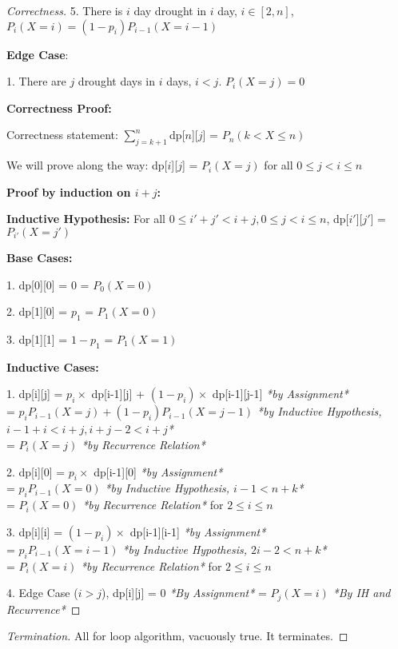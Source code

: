 \documentclass[openany]{article}
\begin{document}
\begin{proof}[Correctness]{}
5. There is $i$ day drought in $i$ day, $i\in[2,n]$,
$P_i(X=i)=(1-p_i)P_{i-1}(X=i-1)$
    
\textbf{Edge Case}:

1. There are $j$ drought days in $i$ days, $i<j$. $P_i(X=j) = 0$

\textbf{Correctness Proof:}

Correctness statement: $\sum_{j=k+1}^{n}$dp[$n$][$j$] = $P_n(k<X\leq n)$
  
We will prove along the way: dp[$i$][$j$] = $P_i(X=j)$ for all $ 0 \leq j < i \leq n$

\textbf{Proof by induction on $i+j$:}

\textbf{Inductive Hypothesis:} For all $0 \leq i'+j'<i+j,0 \leq j < i \leq n$, dp[$i'$][$j'$] = $P_{i'}(X=j')$

\textbf{Base Cases:}

1. dp[0][0] = 0 = $P_0(X=0)$

2. dp[1][0] = $p_1$ = $P_1(X=0)$

3. dp[1][1] = $1-p_1$ = $P_1(X=1)$

\textbf{Inductive Cases:}

1. dp[i][j] = $p_i \times$ dp[i-1][j] + $(1-p_i) \times$ dp[i-1][j-1] \textit{*by Assignment*} \\= $p_i P_{i-1}(X=j) + (1-p_i)P_{i-1}(X=j-1)$ \textit{*by Inductive Hypothesis, $i-1+i < i+j, i+j-2 < i+j$*}
\\= $P_i(X=j)$ \textit{*by Recurrence Relation*}

2. dp[i][0] = $p_i \times$ dp[i-1][0] \textit{*by Assignment*}\\=  $p_i P_{i-1}(X=0)$ \textit{*by Inductive Hypothesis, $i-1 < n+k$*}\\= $P_i(X=0)$  \textit{*by Recurrence Relation*} for $2\leq i \leq n$ 

3. dp[i][i] = $(1-p_i) \times$ dp[i-1][i-1] \textit{*by Assignment*} \\= $p_i P_{i-1}(X=i-1)$ \textit{*by Inductive Hypothesis, $2i-2 < n+k$*} \\=   $P_i(X=i)$ \textit{*by Recurrence Relation*} for $2\leq i \leq n$

4. Edge Case ($i>j$), dp[i][j] = 0 \textit{*By Assignment*} = $P_j(X=i)$ \textit{*By IH and Recurrence*}
\end{proof}
\begin{proof}[Termination]{}
    All for loop algorithm, vacuously true. It terminates.
\end{proof}
\end{document}

